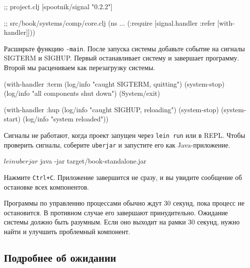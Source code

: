 \else

\begin{english}
  \begin{clojure}
;; project.clj
[spootnik/signal "0.2.2"]

;; src/book/systems/comp/core.clj
(ns ...
  (:require [signal.handler :refer [with-handler]]))
  \end{clojure}
\end{english}

\fi

Расширьте функцию \verb|-main|. После запуска системы добавьте событие на
сигналы SIGTERM и SIGHUP. Первый останавливает систему и завершает
программу. Второй мы расцениваем как перезагрузку системы.

\begin{english}
  \begin{clojure}
(with-handler :term
  (log/info "caught SIGTERM, quitting")
  (system-stop)
  (log/info "all components shut down")
  (System/exit)
  \end{clojure}
\end{english}


\begin{english}
  \begin{clojure}
(with-handler :hup
  (log/info "caught SIGHUP, reloading")
  (system-stop)
  (system-start)
  (log/info "system reloaded"))
  \end{clojure}
\end{english}

Сигналы не работают, когда проект запущен через \verb|lein run| или в
REPL. Чтобы проверить сигналы, соберите \verb|uberjar| и запустите его как
Java-приложение.

\begin{english}
  \begin{bash}
$ lein uberjar
$ java -jar target/book-standalone.jar
  \end{bash}
\end{english}

Нажмите \verb|Ctrl+C|. Приложение завершится не сразу, и вы увидите сообщение
об остановке всех компонентов.

Программы по управлению процессами обычно ждут 30 секунд, пока процесс не
остановится. В противном случае его завершают принудительно. Ожидание системы
должно быть разумным. Если оно выходит на рамки 30 секунд, нужно найти и
улучшить проблемный компонент.

\subsection{Подробнее об ожидании}

